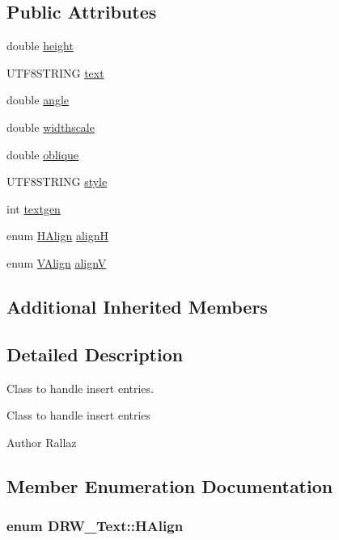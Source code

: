 \subsection*{Public Attributes}
\begin{DoxyCompactItemize}
\item 
double \hyperlink{classDRW__Text_ad38ec2dfef3ab3c4367423a0d4e49c05}{height}
\item 
U\-T\-F8\-S\-T\-R\-I\-N\-G \hyperlink{classDRW__Text_a87a40d4523371ee0cc250be0fc8834cd}{text}
\item 
double \hyperlink{classDRW__Text_aad647ab8b0086a18978dd0b291569e5b}{angle}
\item 
double \hyperlink{classDRW__Text_a17468f7c0e1bd0b1c6da87cc9300b7e1}{widthscale}
\item 
double \hyperlink{classDRW__Text_ab273757633e67aa82b17b6b1141c8b98}{oblique}
\item 
U\-T\-F8\-S\-T\-R\-I\-N\-G \hyperlink{classDRW__Text_a11fa7c1b5a6fccafe2991bad2413cfa8}{style}
\item 
int \hyperlink{classDRW__Text_ada45df3aae10844afc1861261e40869e}{textgen}
\item 
enum \hyperlink{classDRW__Text_a66511da21199b0ab967fa951bc339f2d}{H\-Align} \hyperlink{classDRW__Text_ace4ad466c2d13111f69b4413c279987e}{align\-H}
\item 
enum \hyperlink{classDRW__Text_a369c571137713ac08c5a5a9b66ff6c27}{V\-Align} \hyperlink{classDRW__Text_a1b3c6431eb7c016e3521a46dc24bd57e}{align\-V}
\end{DoxyCompactItemize}
\subsection*{Additional Inherited Members}


\subsection{Detailed Description}
Class to handle insert entries. 

Class to handle insert entries \begin{DoxyAuthor}{Author}
Rallaz 
\end{DoxyAuthor}


\subsection{Member Enumeration Documentation}
\hypertarget{classDRW__Text_a66511da21199b0ab967fa951bc339f2d}{
\subsubsection[{H\-Align}]{\setlength{\rightskip}{0pt plus 5cm}enum {\bf D\-R\-W\-\_\-\-Text\-::\-H\-Align}}}\label{classDRW__Text_a66511da21199b0ab967fa951bc339f2d}



